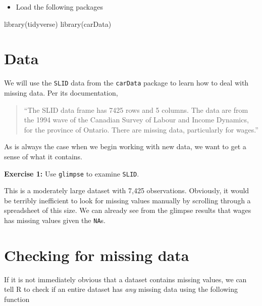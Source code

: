 \documentclass[
]{book}
\makeatletter
\newenvironment{Shaded}{\begin{snugshade}}{\end{snugshade}}
\newcommand{\FunctionTok}[1]{\textcolor[rgb]{0,0,0}{#1}}
\newcommand{\NormalTok}[1]{#1}
\providecommand{\tightlist}{%
  \setlength{\itemsep}{0pt}\setlength{\parskip}{0pt}}
\newenvironment{kframe}{%
\medskip{}
\setlength{\fboxsep}{.8em}
 \def\at@end@of@kframe{}%
 \ifinner\ifhmode%
  \def\at@end@of@kframe{\end{minipage}}%
  \begin{minipage}{\columnwidth}%
 \fi\fi%
 \def\FrameCommand##1{\hskip\@totalleftmargin \hskip-\fboxsep
 \colorbox{shadecolor}{##1}\hskip-\fboxsep
     \hskip-\linewidth \hskip-\@totalleftmargin \hskip\columnwidth}%
 \MakeFramed {\advance\hsize-\width
   \@totalleftmargin\z@ \linewidth\hsize
   \@setminipage}}%
 {\par\unskip\endMakeFramed%
 \at@end@of@kframe}
\renewenvironment{Shaded}{\begin{kframe}}{\end{kframe}}
\newenvironment{rmdblock}[1]
  {\begin{shaded*}
  }
  {\end{shaded*}
  }
\newenvironment{learncheck}
  {\begin{rmdblock}{warning}}
  {\end{rmdblock}}
\makeatother
\begin{document}
\begin{itemize}
\tightlist
\item
  Load the following packages
\end{itemize}

\begin{Shaded}
\begin{Highlighting}[]
\FunctionTok{library}\NormalTok{(tidyverse)}
\FunctionTok{library}\NormalTok{(carData)}
\end{Highlighting}
\end{Shaded}

\hypertarget{data}{%
\section{Data}\label{data}}

We will use the \texttt{SLID} data from the \texttt{carData} package to learn how to deal with missing data. Per its documentation,

\begin{quote}
``The SLID data frame has 7425 rows and 5 columns. The data are from the 1994 wave of the Canadian Survey of Labour and Income Dynamics, for the province of Ontario. There are missing data, particularly for wages.''
\end{quote}

As is always the case when we begin working with new data, we want to get a sense of what it contains.

\begin{learncheck}
\textbf{Exercise 1:} Use \texttt{glimpse} to examine \texttt{SLID}.
\end{learncheck}

This is a moderately large dataset with 7,425 observations. Obviously, it would be terribly inefficient to look for missing values manually by scrolling through a spreadsheet of this size. We can already see from the glimpse results that wages has missing values given the \texttt{NA}s.

\hypertarget{checking-for-missing-data}{%
\section{Checking for missing data}\label{checking-for-missing-data}}

If it is not immediately obvious that a dataset contains missing values, we can tell R to check if an entire dataset has \emph{any} missing data using the following function
\end{document}

